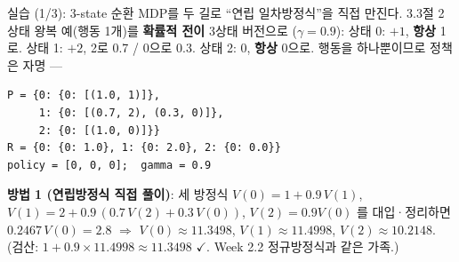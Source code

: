 \begin{frame}[fragile]{실습 (1/3): 3-state 순환 MDP를 두 길로}
  ``연립 일차방정식''을 직접 만진다. 3.3절 2상태 왕복 예(행동
  1개)를 \textbf{확률적 전이} 3상태 버전으로 ($\gamma = 0.9$):
  상태 0: $+1$, \textbf{항상} 1로. 상태 1: $+2$, 2로 0.7 / 0으로
  0.3. 상태 2: $0$, \textbf{항상} 0으로. 행동을 하나뿐이므로
  정책은 자명 --- 
\begin{lstlisting}
P = {0: {0: [(1.0, 1)]},
     1: {0: [(0.7, 2), (0.3, 0)]},
     2: {0: [(1.0, 0)]}}
R = {0: {0: 1.0}, 1: {0: 2.0}, 2: {0: 0.0}}
policy = [0, 0, 0];  gamma = 0.9
\end{lstlisting}
  \textbf{방법 1 (연립방정식 직접 풀이)}: 세 방정식
  $V(0) = 1 + 0.9\,V(1)$,
  $V(1) = 2 + 0.9\,(0.7\,V(2) + 0.3\,V(0))$,
  $V(2) = 0.9 V(0)$ 를 대입·정리하면
  $0.2467\,V(0) = 2.8$ $\Rightarrow$ $V(0) \approx 11.3498$,
  $V(1) \approx 11.4998$, $V(2) \approx 10.2148$.
  (검산: $1 + 0.9 \times 11.4998 \approx 11.3498$ $\checkmark$.
  Week 2.2 정규방정식과 같은 가족.)
\end{frame}
